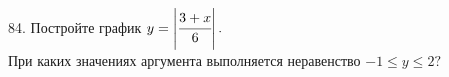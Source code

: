 84. Постройте график $y=\left|\cfrac{3+x}{6}\right|.$\\
При каких значениях аргумента выполняется неравенство $-1\leqslant y\leqslant2?$\\
